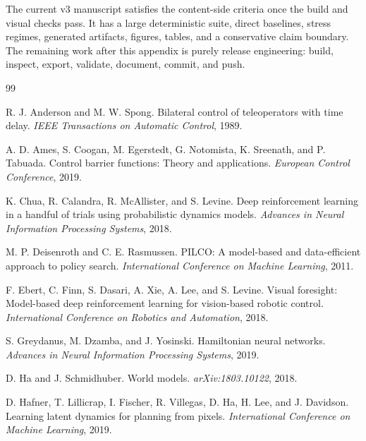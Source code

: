 \documentclass{article}
\begin{document}
The current v3 manuscript satisfies the content-side criteria once the build and visual checks pass. It has a large deterministic suite, direct baselines, stress regimes, generated artifacts, figures, tables, and a conservative claim boundary. The remaining work after this appendix is purely release engineering: build, inspect, export, validate, document, commit, and push.

\begin{thebibliography}{99}

R. J. Anderson and M. W. Spong.
\newblock Bilateral control of teleoperators with time delay.
\newblock \emph{IEEE Transactions on Automatic Control}, 1989.

A. D. Ames, S. Coogan, M. Egerstedt, G. Notomista, K. Sreenath, and P. Tabuada.
\newblock Control barrier functions: Theory and applications.
\newblock \emph{European Control Conference}, 2019.

K. Chua, R. Calandra, R. McAllister, and S. Levine.
\newblock Deep reinforcement learning in a handful of trials using probabilistic dynamics models.
\newblock \emph{Advances in Neural Information Processing Systems}, 2018.

M. P. Deisenroth and C. E. Rasmussen.
\newblock PILCO: A model-based and data-efficient approach to policy search.
\newblock \emph{International Conference on Machine Learning}, 2011.

F. Ebert, C. Finn, S. Dasari, A. Xie, A. Lee, and S. Levine.
\newblock Visual foresight: Model-based deep reinforcement learning for vision-based robotic control.
\newblock \emph{International Conference on Robotics and Automation}, 2018.

S. Greydanus, M. Dzamba, and J. Yosinski.
\newblock Hamiltonian neural networks.
\newblock \emph{Advances in Neural Information Processing Systems}, 2019.

D. Ha and J. Schmidhuber.
\newblock World models.
\newblock \emph{arXiv:1803.10122}, 2018.

D. Hafner, T. Lillicrap, I. Fischer, R. Villegas, D. Ha, H. Lee, and J. Davidson.
\newblock Learning latent dynamics for planning from pixels.
\newblock \emph{International Conference on Machine Learning}, 2019.


\end{thebibliography}
\end{document}
